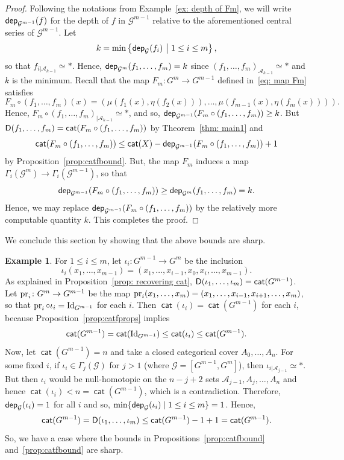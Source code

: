 \documentclass[amscd,amssymb,verbatim,10pt]{amsart}
\numberwithin{equation}{section}
\theoremstyle{plain}
\theoremstyle{definition}
\newtheorem{ex}[theorem]{Example}
\DeclareMathOperator{\cat}{{\mathsf{cat}}}
\def\id{\protect\operatorname{Id}}
\def\pr{\protect\operatorname{pr}}
\newcommand{\cA}{{\mathcal{A}}}
\newcommand{\cG}{{\mathcal{G}}}
\def\scr{\mathcal}
\def\A{{\scr A}}
\newcommand{\D}{{\sf {D}}}
\newcommand{\dep}{{\sf {dep}}}
\begin{document}
\begin{proof}
Following the notations from Example~\ref{ex: depth of Fm}, we will write $\dep_{\cG^{m-1}}(f)$ for the depth of $f$ in $\cG^{m-1}$ relative to the aforementioned central series of $\cG^{m-1}$. Let 
\[
k=\min\left\{\dep_{\cG}(f_i)\ \middle|\ 1\le i \le m\right\},
\]
so that $f_{i|\A_{k-1}}\simeq\ast$. Hence, $\dep_{\cG^m}(f_1,\ldots,f_m) = k$ since 
$(f_1,\ldots,f_m)_{\A_{k-1}} \simeq \ast$ and $k$ is the minimum. 
Recall that the map $F_m\colon G^m\to G^{m-1}$ defined in~\eqref{eq: map Fm} satisfies
\[
F_m\circ (f_1,\dots,f_m)(x)=( \mu(f_1(x),\eta(f_2(x))), \dots, \mu(f_{m-1}(x),\eta(f_m(x))) ).
\]
Hence, $F_m\circ (f_1,\dots,f_m)_{|\A_{k-1}}\simeq\ast$, and so, $\dep_{\cG^{m-1}}(F_m\circ (f_1,\dots,f_m))\ge k$. But $\D(f_1,\dots,f_m)=\cat(F_m\circ(f_1,\dots,f_m))$ by Theorem~\ref{thm: main1} and 
\[
\cat(F_m\circ(f_1,\dots,f_m))\le \cat(X)-\dep_{\cG^{m-1}}(F_m\circ (f_1,\dots,f_m))+1
\]
by Proposition~\ref{prop:catfbound}. But, the map $F_m$ induces a map $\Gamma_i(\cG^m) \to 
\Gamma_i(\cG^{m-1})$, so that 
\[
\dep_{\cG^{m-1}}(F_m \circ (f_1,\ldots,f_m)) \geq 
\dep_{\cG^m}(f_1,\ldots,f_m)=k. 
\]
Hence, we may replace $\dep_{\cG^{m-1}}(F_m 
\circ (f_1,\ldots,f_m))$ by the relatively more computable quantity $k$.
This completes the proof.
\end{proof}

We conclude this section by showing that the above bounds are sharp.


\begin{ex}\label{exam:sharpineq}
For $1\le i \le m$, let $\iota_i\colon G^{m-1}\to G^m$ be the inclusion 
\[
\iota_i(x_1,\dots,x_{m-1})=(x_1,\dots,x_{i-1},x_0,x_{i},\dots,x_{m-1}).
\]
As explained in Proposition~\ref{prop: recovering cat}, $\D(\iota_1,\dots,\iota_m)=\cat(G^{m-1})$. Let $\pr_i\colon G^m\to G^{m-1}$ be the map $\pr_i(x_1,\dots,x_m)=(x_1,\dots,x_{i-1},x_{i+1},\dots,x_m)$, so that $\pr_i\circ\iota_i=\id_{G^{m-1}}$ for each $i$. Then $\cat(\iota_i)=\cat(G^{m-1})$ for each $i$, because Proposition~\ref{prop:catfprops} implies
$$\cat(G^{m-1}) = \cat(\id_{G^{m-1}}) \leq \cat(\iota_i) \leq \cat(G^{m-1}).
$$
Now, let $\cat(G^{m-1})=n$ and take a closed categorical cover $A_0, \ldots,A_n$. For some fixed $i$, if $\iota_i \in \Gamma_j(\cG)$ for $j > 1$ (where $\cG =
[G^{m-1},G^m]$), then $\iota_{i|\cA_{j-1}} \simeq *$. But then $\iota_i$
would be null-homotopic on the $n-j+2$ sets $\cA_{j-1}, A_j,\ldots, A_n$
and hence $\cat(\iota_i) < n=\cat(G^{m-1})$, which is a contradiction. Therefore, $\dep_{\cG}(\iota_i)=1$ for all $i$ and so, $\min\{\dep_{\cG}(\iota_i)\mid 1\le i \le m\}=1$. Hence,
\[
\cat(G^{m-1}) = \D(\iota_1,\dots,\iota_m) \leq \cat(G^{m-1}) - 1+1 =\cat(G^{m-1}).
\]
So, we have a case where the bounds in Propositions~\ref{prop:catfbound} and~\ref{prop:catfbound} are sharp.
\end{ex}
\end{document}
